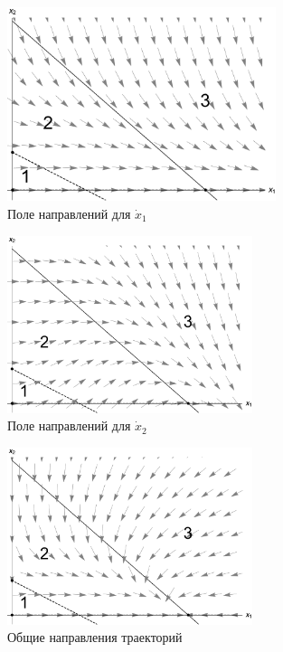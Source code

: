 \documentclass[12pt,a4paper]{article}
\begin{document}
    \begin{figure}[h]
        \centering
        \includegraphics[width=0.7\textwidth]{dirFields_31.pdf}
        \caption{Поле направлений для $ \dot x_1 $}
        \label{fig:dirFields_31}
    \end{figure}

    \pagebreak

    \begin{figure}[h]
        \centering
        \includegraphics[width=0.64\textwidth]{dirFields_32.pdf}
        \caption{Поле направлений для $ \dot x_2 $}
        \label{fig:dirFields_32}
    \end{figure}
    
    \begin{figure}[h]
        \centering
        \includegraphics[width=0.64\textwidth]{areas_3.pdf}
        \caption{Общие направления траекторий}
        \label{fig:areas_3}
    \end{figure}
\end{document}

